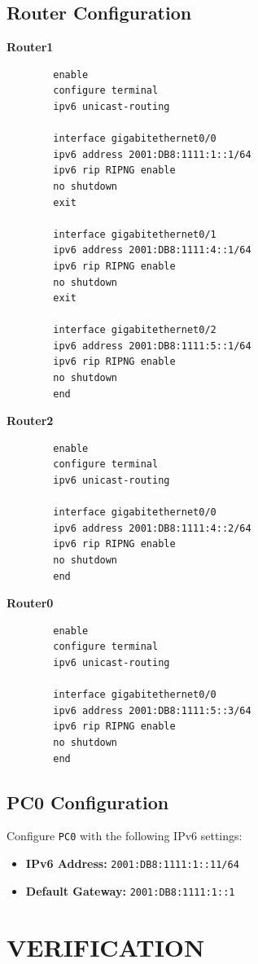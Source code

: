 \documentclass[12pt,a4paper]{article}
\begin{document}
	\subsection*{Router Configuration}
	\textbf{Router1}
	\begin{lstlisting}
		enable
		configure terminal
		ipv6 unicast-routing
		
		interface gigabitethernet0/0
		ipv6 address 2001:DB8:1111:1::1/64
		ipv6 rip RIPNG enable
		no shutdown
		exit
		
		interface gigabitethernet0/1
		ipv6 address 2001:DB8:1111:4::1/64
		ipv6 rip RIPNG enable
		no shutdown
		exit
		
		interface gigabitethernet0/2
		ipv6 address 2001:DB8:1111:5::1/64
		ipv6 rip RIPNG enable
		no shutdown
		end
	\end{lstlisting}
	
	\textbf{Router2}
	\begin{lstlisting}
		enable
		configure terminal
		ipv6 unicast-routing
		
		interface gigabitethernet0/0
		ipv6 address 2001:DB8:1111:4::2/64
		ipv6 rip RIPNG enable
		no shutdown
		end
	\end{lstlisting}
	
	\textbf{Router0}
	\begin{lstlisting}
		enable
		configure terminal
		ipv6 unicast-routing
		
		interface gigabitethernet0/0
		ipv6 address 2001:DB8:1111:5::3/64
		ipv6 rip RIPNG enable
		no shutdown
		end
	\end{lstlisting}
	
	\subsection*{PC0 Configuration}
	Configure \texttt{PC0} with the following IPv6 settings:
	\begin{itemize}
		\item \textbf{IPv6 Address:} \texttt{2001:DB8:1111:1::11/64}
		\item \textbf{Default Gateway:} \texttt{2001:DB8:1111:1::1}
	\end{itemize}
	
	\section*{VERIFICATION}
\end{document}
